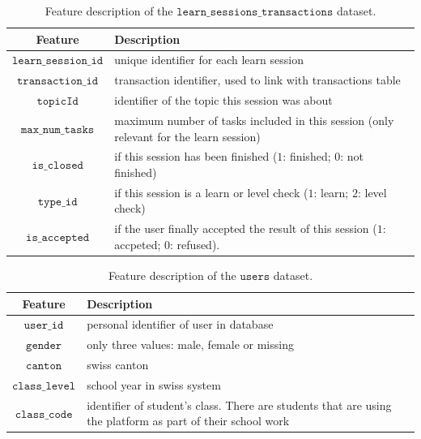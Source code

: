 \documentclass[sigplan,screen]{acmart}
\begin{document}
\begin{table}[h]
  \caption{Feature description of the $\texttt{learn\_sessions\_transactions}$ dataset.}
  \label{tab:learn}
  \begin{tabular}{cl}
    \toprule
    \textbf{Feature}&\textbf{Description}\\
    \midrule
    $\texttt{learn\_session\_id}$ & unique identifier for each learn session \\
    $\texttt{transaction\_id}$ & transaction identifier, used to link with transactions table \\
    $\texttt{topicId}$ & identifier of the topic this session was about \\
    $\texttt{max\_num\_tasks}$ & maximum number of tasks included in this session (only relevant for the learn session) \\
    $\texttt{is\_closed}$ & if this session has been finished ($1$: finished; $0$: not finished) \\
    $\texttt{type\_id}$ & if this session is a learn or level check ($1$: learn; $2$: level check) \\
    $\texttt{is\_accepted}$ & if the user finally accepted the result of this session ($1$: accpeted; $0$: refused). \\
    \bottomrule
    \end{tabular}
\end{table}

\begin{table}[h]
  \caption{Feature description of the $\texttt{users}$ dataset.}
  \label{tab:users}
  \begin{tabular}{cl}
    \toprule
    \textbf{Feature}&\textbf{Description}\\
    \midrule
    $\texttt{user\_id}$ & personal identifier of user in database \\
    $\texttt{gender}$ & only three values: male, female or missing \\
    $\texttt{canton}$ & swiss canton \\
    $\texttt{class\_level}$ & school year in swiss system \\
    $\texttt{class\_code}$ & identifier of student's class. There are students that are using the platform as part of their school work \\
    \bottomrule
    \end{tabular}
\end{table}
\end{document}
